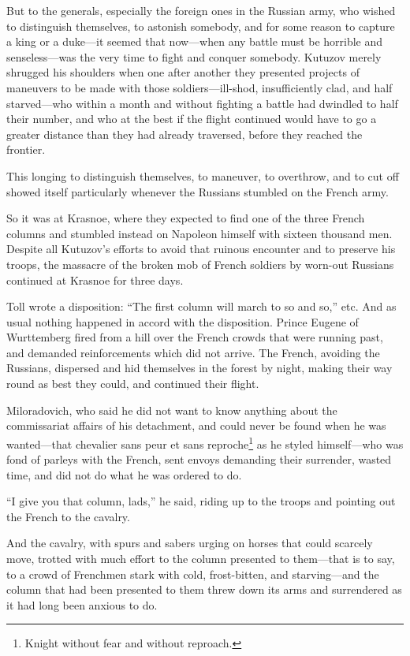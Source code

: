But to the generals, especially the foreign ones in the Russian
army, who wished to distinguish themselves, to astonish somebody,
and for some reason to capture a king or a duke---it seemed that
now---when any battle must be horrible and senseless---was the
very time to fight and conquer somebody. Kutuzov merely shrugged
his shoulders when one after another they presented projects of
maneuvers to be made with those soldiers---ill-shod,
insufficiently clad, and half starved---who within a month and
without fighting a battle had dwindled to half their number, and
who at the best if the flight continued would have to go a
greater distance than they had already traversed, before they
reached the frontier.

This longing to distinguish themselves, to maneuver, to
overthrow, and to cut off showed itself particularly whenever the
Russians stumbled on the French army.

So it was at Krasnoe, where they expected to find one of the
three French columns and stumbled instead on Napoleon himself
with sixteen thousand men. Despite all Kutuzov's efforts to avoid
that ruinous encounter and to preserve his troops, the massacre
of the broken mob of French soldiers by worn-out Russians
continued at Krasnoe for three days.

Toll wrote a disposition: ``The first column will march to so and
so,'' etc. And as usual nothing happened in accord with the
disposition.  Prince Eugene of Wurttemberg fired from a hill over
the French crowds that were running past, and demanded
reinforcements which did not arrive. The French, avoiding the
Russians, dispersed and hid themselves in the forest by night,
making their way round as best they could, and continued their
flight.

Miloradovich, who said he did not want to know anything about the
commissariat affairs of his detachment, and could never be found
when he was wanted---that chevalier sans peur et sans
reproche\footnote{Knight without fear and without reproach.}  as
he styled himself---who was fond of parleys with the French, sent
envoys demanding their surrender, wasted time, and did not do
what he was ordered to do.

``I give you that column, lads,'' he said, riding up to the
troops and pointing out the French to the cavalry.

And the cavalry, with spurs and sabers urging on horses that
could scarcely move, trotted with much effort to the column
presented to them---that is to say, to a crowd of Frenchmen stark
with cold, frost-bitten, and starving---and the column that had
been presented to them threw down its arms and surrendered as it
had long been anxious to do.

